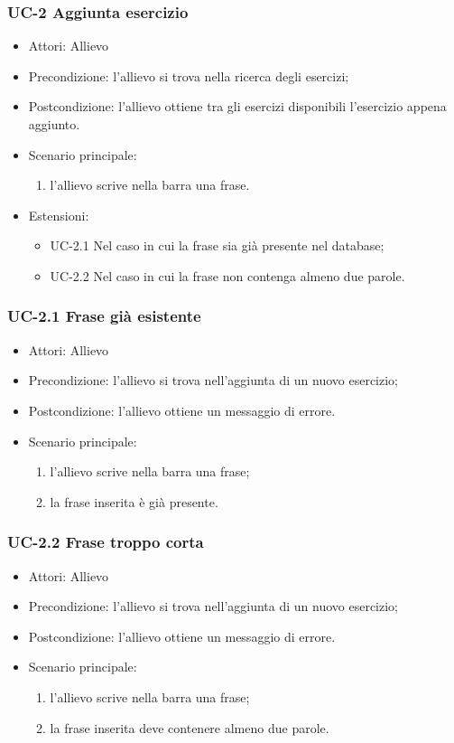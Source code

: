 	\subsubsection{UC-2 Aggiunta esercizio}
		\begin{itemize}
			\item Attori: Allievo
			\item Precondizione: l'allievo si trova nella ricerca degli esercizi;
			\item Postcondizione: l'allievo ottiene tra gli esercizi disponibili l'esercizio appena aggiunto.
			\item Scenario principale:
				\begin{enumerate}
					\item l'allievo scrive nella barra una frase.
				\end{enumerate}
			\item Estensioni:
				\begin{itemize}
					\item UC-2.1 Nel caso in cui la frase sia già presente nel database;
					\item UC-2.2 Nel caso in cui la frase non contenga almeno due parole.
				\end{itemize}
		\end{itemize}
	\subsubsection{UC-2.1 Frase già esistente}
		\begin{itemize}
			\item Attori: Allievo
			\item Precondizione: l'allievo si trova nell'aggiunta di un nuovo esercizio;
			\item Postcondizione: l'allievo ottiene un messaggio di errore.
			\item Scenario principale:
				\begin{enumerate}
					\item l'allievo scrive nella barra una frase;
					\item la frase inserita è già presente.
				\end{enumerate}
		\end{itemize}
	\subsubsection{UC-2.2 Frase troppo corta}
		\begin{itemize}
			\item Attori: Allievo
			\item Precondizione: l'allievo si trova nell'aggiunta di un nuovo esercizio;
			\item Postcondizione: l'allievo ottiene un messaggio di errore.
			\item Scenario principale:
				\begin{enumerate}
					\item l'allievo scrive nella barra una frase;
					\item la frase inserita deve contenere almeno due parole.
				\end{enumerate}
		\end{itemize}
